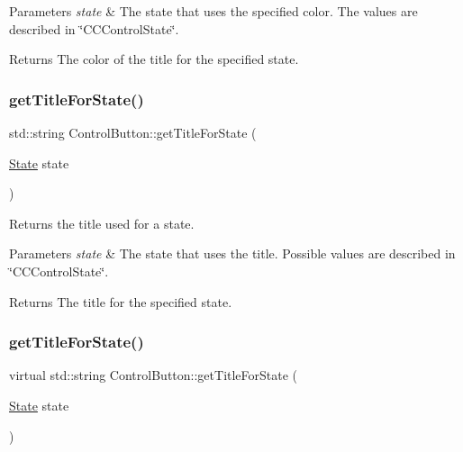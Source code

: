 \begin{DoxyParams}{Parameters}
{\em state} & The state that uses the specified color. The values are described in \char`\"{}\+C\+C\+Control\+State\char`\"{}.\\
\hline
\end{DoxyParams}
\begin{DoxyReturn}{Returns}
The color of the title for the specified state. 
\end{DoxyReturn}
\mbox{\label{classControlButton_ab98a3599eecfd9271a5980712562c9c0}} 
\subsubsection{\texorpdfstring{get\+Title\+For\+State()}{getTitleForState()}\hspace{0.1cm}{\footnotesize\ttfamily [1/2]}}
{\footnotesize\ttfamily std\+::string Control\+Button\+::get\+Title\+For\+State (\begin{DoxyParamCaption}\item[{\hyperlink{classControl_a89e9598cd785841ac91cff3c4798c469}{State}}]{state }\end{DoxyParamCaption})\hspace{0.3cm}{\ttfamily [virtual]}}

Returns the title used for a state.


\begin{DoxyParams}{Parameters}
{\em state} & The state that uses the title. Possible values are described in \char`\"{}\+C\+C\+Control\+State\char`\"{}.\\
\hline
\end{DoxyParams}
\begin{DoxyReturn}{Returns}
The title for the specified state. 
\end{DoxyReturn}
\mbox{\label{classControlButton_afd7b890cb4494d7545bc8990ba43dbc2}} 
\subsubsection{\texorpdfstring{get\+Title\+For\+State()}{getTitleForState()}\hspace{0.1cm}{\footnotesize\ttfamily [2/2]}}
{\footnotesize\ttfamily virtual std\+::string Control\+Button\+::get\+Title\+For\+State (\begin{DoxyParamCaption}\item[{\hyperlink{classControl_a89e9598cd785841ac91cff3c4798c469}{State}}]{state }\end{DoxyParamCaption})\hspace{0.3cm}{\ttfamily [virtual]}}

